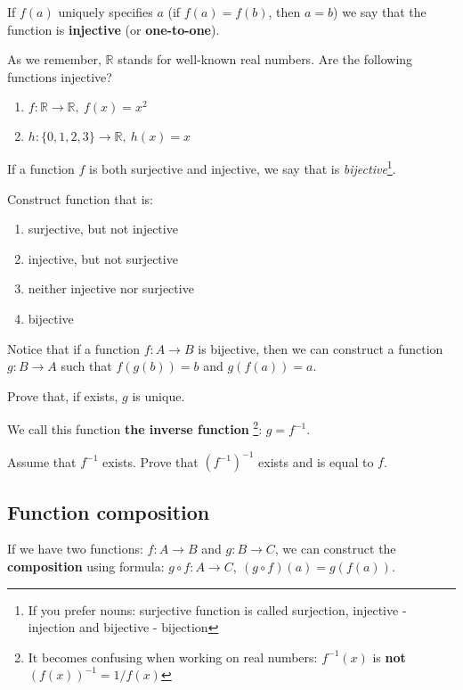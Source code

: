 If $f(a)$ uniquely specifies $a$ (if $f(a)=f(b)$, then $a=b$) we say that the function is \textbf{injective}
(or \textbf{one-to-one}).
\begin{prob}
	As we remember, $\mathbb{R}$ stands for well-known real numbers. Are the following functions injective?
	\begin{enumerate}
		\item $f: \mathbb{R} \to \mathbb R, ~f(x)=x^2$
		\item $h: \{0,1,2,3\} \to \mathbb R, ~h(x)=x$
	\end{enumerate}
\end{prob}

If a function $f$ is both surjective and injective, we say that is \textit{bijective}\footnote{If you prefer nouns: surjective function is called surjection, injective - injection
and bijective - bijection}.

\begin{prob}
	Construct function that is:
	\begin{enumerate}
		\item surjective, but not injective
		\item injective, but not surjective
		\item neither injective nor surjective
		\item bijective
	\end{enumerate}
\end{prob}

\noindent Notice that if a function $f: A\to B$ is bijective, then we can construct a function $g:B\to A$
such that $f(g(b))=b$ and $g(f(a))=a$.
\begin{prob}
	Prove that, if exists, $g$ is unique.
\end{prob}

\noindent We call this function \textbf{the inverse function}
\footnote{It becomes confusing when working on real numbers: $f^{-1}(x)$ is
\textbf{not} $(f(x))^{-1}=1/f(x)$}: $g=f^{-1}.$

\begin{prob}
	Assume that $f^{-1}$ exists. Prove that $(f^{-1})^{-1}$ exists and is equal to $f$.
\end{prob}

\subsection{Function composition}
If we have two functions: $f:A\to B$ and $g: B\to C$, we can construct the \textbf{composition} using formula:
$g\circ f: A\to C,~(g\circ f)(a) = g(f(a)).$

